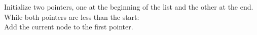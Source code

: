 \documentclass[preview]{standalone}
\begin{document}
Initialize two pointers, one at the beginning of the list and the other at the end.\\While both pointers are less than the start:\\Add the current node to the first pointer.\\
\end{document}
